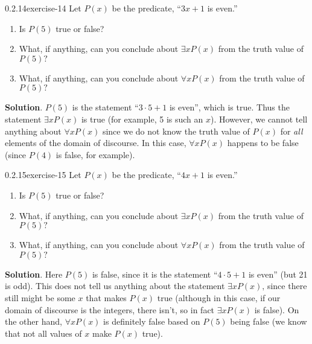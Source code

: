 \documentclass[twoside,11pt,]{book}
\numberwithin{equation}{chapter}
\begin{document}
\begin{divisionsolution}{0.2.14}{}{exercise-14}%
\hypertarget{p-359}{}%
Let \(P(x)\) be the predicate, ``\(3x+1\) is even.''\leavevmode%
\begin{enumerate}[label=(\alph*)]
\item\hypertarget{li-392}{}\hypertarget{p-360}{}%
Is \(P(5)\) true or false? %
\item\hypertarget{li-397}{}\hypertarget{p-361}{}%
What, if anything, can you conclude about \(\exists x P(x)\) from the truth value of \(P(5)\text{?}\)%
\item\hypertarget{li-398}{}\hypertarget{p-362}{}%
What, if anything, can you conclude about \(\forall x P(x)\) from the truth value of \(P(5)\text{?}\)%
\end{enumerate}
%
\par\smallskip%
\noindent\textbf{Solution}.\quad%
\hypertarget{p-363}{}%
\(P(5)\) is the statement ``\(3\cdot 5 + 1\) is even'', which is true. Thus the statement \(\exists x P(x)\) is true (for example, 5 is such an \(x\)). However, we cannot tell anything about \(\forall x P(x)\) since we do not know the truth value of \(P(x)\) for \emph{all} elements of the domain of discourse. In this case, \(\forall x P(x)\) happens to be false (since \(P(4)\) is false, for example).%
\end{divisionsolution}%
\begin{divisionsolution}{0.2.15}{}{exercise-15}%
\hypertarget{p-371}{}%
Let \(P(x)\) be the predicate, ``\(4x+1\) is even.''\leavevmode%
\begin{enumerate}[label=(\alph*)]
\item\hypertarget{li-402}{}\hypertarget{p-372}{}%
Is \(P(5)\) true or false? %
\item\hypertarget{li-407}{}\hypertarget{p-373}{}%
What, if anything, can you conclude about \(\exists x P(x)\) from the truth value of \(P(5)\text{?}\)%
\item\hypertarget{li-408}{}\hypertarget{p-374}{}%
What, if anything, can you conclude about \(\forall x P(x)\) from the truth value of \(P(5)\text{?}\)%
\end{enumerate}
%
\par\smallskip%
\noindent\textbf{Solution}.\quad%
\hypertarget{p-375}{}%
Here \(P(5)\) is false, since it is the statement ``\(4\cdot 5 + 1\) is even'' (but 21 is odd). This does not tell us anything about the statement \(\exists x P(x)\text{,}\) since there still might be some \(x\) that makes \(P(x)\) true (although in this case, if our domain of discourse is the integers, there isn't, so in fact \(\exists x P(x)\) is false). On the other hand, \(\forall x P(x)\) is definitely false based on \(P(5)\) being false (we know that not all values of \(x\) make \(P(x)\) true).%
\end{divisionsolution}%
\end{document}
